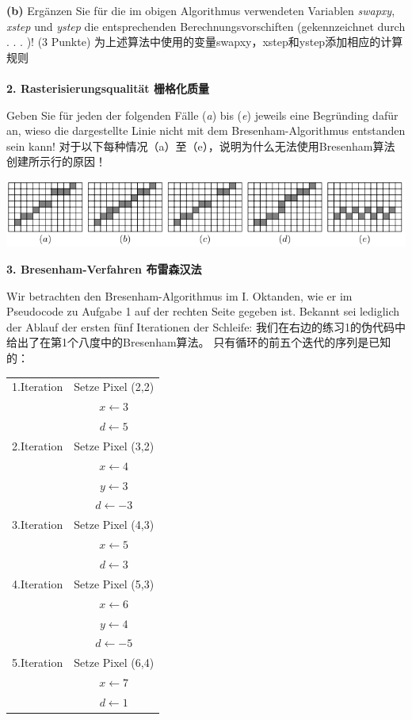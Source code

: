 \documentclass[fleqn]{article}
\begin{document}
\indent\textbf{(b)} Ergänzen Sie für die im obigen Algorithmus verwendeten Variablen \textit{swapxy}, \textit{xstep} und \textit{ystep} die entsprechenden Berechnungsvorschiften (gekennzeichnet durch . . . )! (3 Punkte)
为上述算法中使用的变量swapxy，xstep和ystep添加相应的计算规则
\\
\\
\noindent\textbf{2. Rasterisierungsqualität 栅格化质量}

Geben Sie für jeden der folgenden Fälle (\textit{a}) bis (\textit{e}) jeweils eine Begründing dafür an, wieso die dargestellte Linie nicht mit dem Bresenham-Algorithmus entstanden sein kann!
对于以下每种情况（a）至（e），说明为什么无法使用Bresenham算法创建所示行的原因！

\begin{center}
    \includegraphics[scale=0.5]{13.png}
\end{center}

\noindent\textbf{3. Bresenham-Verfahren 布雷森汉法}

Wir betrachten den Bresenham-Algorithmus im I. Oktanden, wie er im Pseudocode zu Aufgabe 1 auf der rechten Seite gegeben ist. Bekannt sei lediglich der Ablauf der ersten fünf Iterationen der Schleife:
我们在右边的练习1的伪代码中给出了在第1个八度中的Bresenham算法。 只有循环的前五个迭代的序列是已知的：

\begin{center}
    \begin{tabular}{cc}
        1.Iteration & Setze Pixel (2,2)\\
        &$x\leftarrow 3$\\
        &$d\leftarrow 5$\\
        \hline
        2.Iteration & Setze Pixel (3,2)\\
        &$x\leftarrow 4$\\
        &$y\leftarrow 3$\\
        &$d\leftarrow -3$\\
        \hline
        3.Iteration & Setze Pixel (4,3)\\
        &$x\leftarrow 5$\\
        &$d\leftarrow 3$\\
        \hline
        4.Iteration & Setze Pixel (5,3)\\
        &$x\leftarrow 6$\\
        &$y\leftarrow 4$\\
        &$d\leftarrow -5$\\
        \hline
        5.Iteration & Setze Pixel (6,4)\\
        &$x\leftarrow 7$\\
        &$d\leftarrow 1$\\
    \end{tabular}
\end{center}
\end{document}
